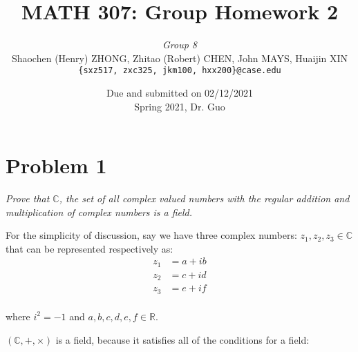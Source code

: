\documentclass[11pt]{article}
\newcommand{\ilc}{\texttt}
\begin{document}
\title{\textbf{MATH 307: Group Homework 2}}


\author{\textit{Group 8}\\
Shaochen (Henry) ZHONG, Zhitao (Robert) CHEN, John MAYS, Huaijin XIN\\ \ilc{\{sxz517, zxc325, jkm100, hxx200\}@case.edu}}

\date{Due and submitted on 02/12/2021 \\ Spring 2021, Dr. Guo}
\maketitle



\section*{Problem 1}

\textit{ Prove that $\mathbb{C}$, the set of all complex valued numbers with the regular addition and multiplication of complex numbers is a field.}\newline


For the simplicity of discussion, say we have three complex numbers: $z_1,z_2,z_3 \in \mathbb{C}$ that can be represented respectively as:
\begin{equation*}
\begin{split}
    z_1&=a+ib\\
    z_2&=c+id\\
    z_3&=e+if\\
\end{split}
\end{equation*}

where $i^2 = -1$ and $a,b,c,d,e,f \in \mathbb{R}$.\newline

\noindent $(\mathbb{C}, +, \times)$ is a field, because it satisfies all of the conditions for a field:
\end{document}
